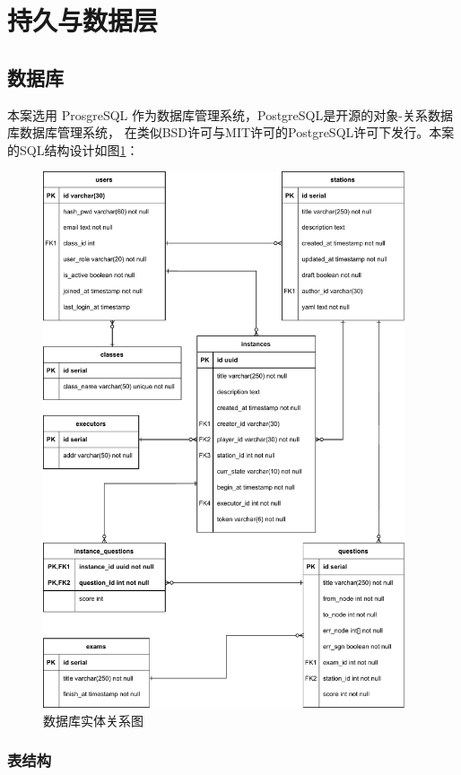 \section{持久与数据层}
\subsection{数据库}
本案选用 ProsgreSQL 作为数据库管理系统，PostgreSQL是开源的对象-关系数据库数据库管理系统，
在类似BSD许可与MIT许可的PostgreSQL许可下发行。本案的SQL结构设计如图\ref{erd}：

\begin{figure}[htbp!]
    \centering
    \includegraphics[width=0.95\textwidth]{figures/pdf/erd.pdf}
    \caption{\label{erd}数据库实体关系图}
\end{figure}

\subsubsection{表结构}

